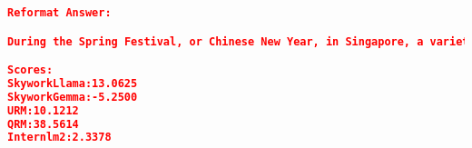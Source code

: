 \begin{lstlisting}[language=json,numbers=none]
Reformat Answer:

During the Spring Festival, or Chinese New Year, in Singapore, a variety of traditional performances can be seen that reflect the country's rich cultural heritage, particularly its Chinese influences. Singapore is a multi-ethnic nation with a significant Chinese population, which makes the Spring Festival an important and vibrant part of its cultural calendar. The lion dance is one of the most iconic performances during the Spring Festival in Singapore, it is believed to bring good luck and fortune, performers mimic a lion's movements in a lion costume to the beat of drums, gongs, and cymbals, the dance often includes acrobatic elements and the lions may interact with the audience or perform stunts such as "cai qing", where they pluck green vegetables like lettuce, tied to a red envelope (hongbao)

Scores:
SkyworkLlama:13.0625
SkyworkGemma:-5.2500
URM:10.1212
QRM:38.5614
Internlm2:2.3378
\end{lstlisting}